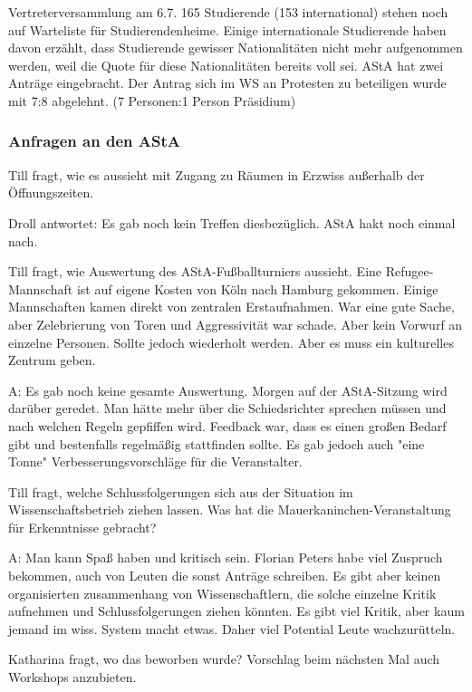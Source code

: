\documentclass[ngerman,headheight=70pt]{scrartcl}
\begin{document}
    Vertreterversammlung am 6.7.
    165 Studierende (153 international) stehen noch auf Warteliste
    für Studierendenheime. Einige internationale Studierende haben
    davon erzählt, dass Studierende gewisser Nationalitäten nicht mehr
    aufgenommen werden, weil die Quote für diese Nationalitäten bereits
    voll sei. AStA hat zwei Anträge eingebracht. Der Antrag sich im WS
    an Protesten zu beteiligen wurde mit 7:8 abgelehnt. (7 Personen:1 Person Präsidium)

    \subsubsection{Anfragen an den AStA}

    Till fragt, wie es aussieht mit Zugang zu Räumen in Erzwiss außerhalb
    der Öffnungszeiten.

    Droll antwortet: Es gab noch kein Treffen diesbezüglich. AStA hakt noch
    einmal nach.

    Till fragt, wie Auswertung des AStA-Fußballturniers aussieht.
    Eine Refugee-Mannschaft ist auf eigene Kosten von Köln nach Hamburg
    gekommen. Einige Mannschaften kamen direkt von zentralen
    Erstaufnahmen. War eine gute Sache, aber Zelebrierung von Toren
    und Aggressivität war schade. Aber kein Vorwurf an einzelne Personen.
    Sollte jedoch wiederholt werden. Aber es muss ein kulturelles
    Zentrum geben.

    A: Es gab noch keine gesamte Auswertung. Morgen auf der AStA-Sitzung
    wird darüber geredet. Man hätte mehr über die Schiedsrichter sprechen
    müssen und nach welchen Regeln gepfiffen wird. Feedback war, dass es
    einen großen Bedarf gibt und bestenfalls regelmäßig stattfinden sollte.
    Es gab jedoch auch "eine Tonne" Verbesserungsvorschläge für die Veranstalter.

    Till fragt, welche Schlussfolgerungen sich aus der Situation im
    Wissenschaftsbetrieb ziehen lassen. Was hat die Mauerkaninchen-Veranstaltung
    für Erkenntnisse gebracht?

    A: Man kann Spaß haben und kritisch sein. Florian Peters habe viel Zuspruch
    bekommen, auch von Leuten die sonst Anträge schreiben. Es gibt aber keinen
    organisierten zusammenhang von Wissenschaftlern, die solche einzelne
    Kritik aufnehmen und Schlussfolgerungen ziehen könnten. Es gibt viel Kritik,
    aber kaum jemand im wiss. System macht etwas. Daher viel Potential Leute
    wachzurütteln.

    Katharina fragt, wo das beworben wurde? Vorschlag beim nächsten Mal
    auch Workshops anzubieten.
\end{document}
